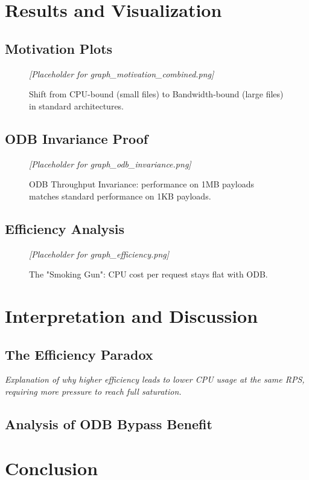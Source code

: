 \documentclass[a4paper,12pt]{article}
\begin{document}
\newpage
\section{Results and Visualization}

\subsection{Motivation Plots}
\begin{figure}[h]
    \centering
    \textit{[Placeholder for graph\_motivation\_combined.png]}
    \caption{Shift from CPU-bound (small files) to Bandwidth-bound (large files) in standard architectures.}
\end{figure}

\subsection{ODB Invariance Proof}
\begin{figure}[h]
    \centering
    \textit{[Placeholder for graph\_odb\_invariance.png]}
    \caption{ODB Throughput Invariance: performance on 1MB payloads matches standard performance on 1KB payloads.}
\end{figure}

\subsection{Efficiency Analysis}
\begin{figure}[h]
    \centering
    \textit{[Placeholder for graph\_efficiency.png]}
    \caption{The "Smoking Gun": CPU cost per request stays flat with ODB.}
\end{figure}

\section{Interpretation and Discussion}

\subsection{The Efficiency Paradox}
\textit{Explanation of why higher efficiency leads to lower CPU usage at the same RPS, requiring more pressure to reach full saturation.}

\subsection{Analysis of ODB Bypass Benefit}

\section{Conclusion}
\end{document}
